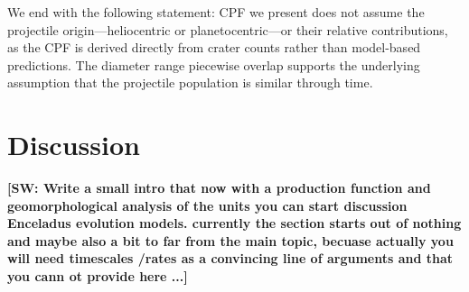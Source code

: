 \documentclass[preprint,11pt,3p,times,authoryear]{elsarticle}
\begin{document}
{We end with the following statement: CPF we present does not assume the projectile origin—heliocentric or planetocentric—or their relative contributions, as the CPF is derived directly from crater counts rather than model-based predictions. The diameter range piecewise overlap supports the underlying assumption that the projectile population is similar through time. 




\section{Discussion}

\textbf{[SW: Write a small intro that now with a production function and geomorphological analysis of the units you can start discussion Enceladus evolution models.
currently the section starts out of nothing and maybe also a bit to far from the main topic, becuase actually you will need timescales /rates as a convincing line of arguments and that you cann ot provide here ...]\\}
}
\end{document}

